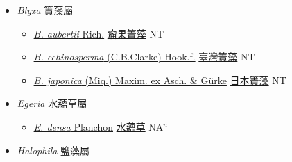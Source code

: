
  \begin{itemize}
 \item[] \textit{Blyxa} 簀藻屬
                    
  \begin{itemize}
        \item[] \href{http://www.theplantlist.org/tpl1.1/search?q=Blyxa+aubertii}{\textit{B. aubertii} Rich.}   \href{\detokenize{http://taibnet.sinica.edu.tw/chi/taibnet_species_list.php?T2=瘤果簀藻&T2_new_value=true&fr=y}}{瘤果簀藻} NT
        \item[] \href{http://www.theplantlist.org/tpl1.1/search?q=Blyxa+echinosperma}{\textit{B. echinosperma} (C.B.Clarke) Hook.f.}   \href{\detokenize{http://taibnet.sinica.edu.tw/chi/taibnet_species_list.php?T2=臺灣簀藻&T2_new_value=true&fr=y}}{臺灣簀藻} NT
        \item[] \href{http://www.theplantlist.org/tpl1.1/search?q=Blyxa+japonica}{\textit{B. japonica} (Miq.) Maxim. ex Asch. \& Gürke}   \href{\detokenize{http://taibnet.sinica.edu.tw/chi/taibnet_species_list.php?T2=日本簀藻&T2_new_value=true&fr=y}}{日本簀藻} NT
  \end{itemize}
 \item[] \textit{Egeria} 水蘊草屬
                    
  \begin{itemize}
        \item[] \href{http://www.theplantlist.org/tpl1.1/search?q=Egeria+densa}{\textit{E. densa} Planchon}   \href{\detokenize{http://taibnet.sinica.edu.tw/chi/taibnet_species_list.php?T2=水蘊草&T2_new_value=true&fr=y}}{水蘊草} NA$^n$
  \end{itemize}
 \item[] \textit{Halophila} 鹽藻屬
                    

\end{itemize}
